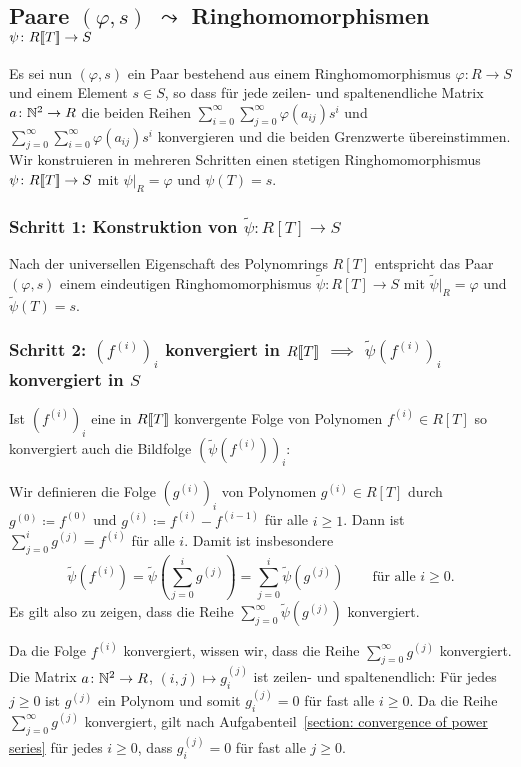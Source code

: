 \documentclass[a4paper, 10pt, numbers=noenddot]{scrartcl}
\begin{document}
\subsection*{Paare $(\varphi, s)$ $\leadsto$ Ringhomomorphismen $\psi \colon R[\![T]\!] \to S$}

Es sei nun $(\varphi, s)$ ein Paar bestehend aus einem Ringhomomorphismus $\varphi \colon R \to S$ und einem Element $s \in S$, so dass für jede zeilen- und spaltenendliche Matrix $a \colon \mathbb{N}^2 \to R$ die beiden Reihen $\sum_{i=0}^\infty \sum_{j=0}^\infty \varphi(a_{ij}) s^i$ und $\sum_{j=0}^\infty \sum_{i=0}^\infty \varphi(a_{ij}) s^i$ konvergieren und die beiden Grenzwerte übereinstimmen.
Wir konstruieren in mehreren Schritten einen stetigen Ringhomomorphismus $\psi \colon R[\![T]\!] \to S$ mit $\psi|_R = \varphi$ und $\psi(T) = s$.


\subsubsection*{Schritt 1: Konstruktion von $\tilde{\psi} \colon R[T] \to S$}
Nach der universellen Eigenschaft des Polynomrings $R[T]$ entspricht das Paar $(\varphi, s)$ einem eindeutigen Ringhomomorphismus $\tilde{\psi} \colon R[T] \to S$ mit $\tilde{\psi}|_R = \varphi$ und $\tilde{\psi}(T) = s$.


\subsubsection*{Schritt 2: $(f^{(i)})_i$ konvergiert in $R[\![T]\!]$ $\implies$ $\tilde{\psi}(f^{(i)})_i$ konvergiert in $S$}
Ist $(f^{(i)})_i$ eine in $R[\![T]\!]$ konvergente Folge von Polynomen $f^{(i)} \in R[T]$ so konvergiert auch die Bildfolge $( \tilde{\psi}(f^{(i)}) )_i$:

Wir definieren die Folge $( g^{(i)} )_i$ von Polynomen $g^{(i)} \in R[T]$ durch $g^{(0)} \coloneqq f^{(0)}$ und $g^{(i)} \coloneqq f^{(i)} - f^{(i-1)}$ für alle $i \geq 1$.
Dann ist $\sum_{j=0}^i g^{(j)} = f^{(i)}$ für alle $i$.
Damit ist insbesondere
\[
    \tilde{\psi}(f^{(i)})
  = \tilde{\psi}\left( \sum_{j=0}^i g^{(j)} \right)
  = \sum_{j=0}^i \tilde{\psi}(g^{(j)})
  \qquad
  \text{für alle $i \geq 0$}.
\]
Es gilt also zu zeigen, dass die Reihe $\sum_{j=0}^\infty \tilde{\psi}(g^{(j)})$ konvergiert.

Da die Folge $f^{(i)}$ konvergiert, wissen wir, dass die Reihe $\sum_{j=0}^\infty g^{(j)}$ konvergiert.
Die Matrix $a \colon \mathbb{N}^2 \to R$, $(i,j) \mapsto g^{(j)}_i$ ist zeilen- und spaltenendlich:
Für jedes $j \geq 0$ ist $g^{(j)}$ ein Polynom und somit $g^{(j)}_i = 0$ für fast alle $i \geq 0$.
Da die Reihe $\sum_{j=0}^\infty g^{(j)}$ konvergiert, gilt nach Aufgabenteil~\ref{section: convergence of power series} für jedes $i \geq 0$, dass $g^{(j)}_i = 0$ für fast alle $j \geq 0$.
\end{document}
